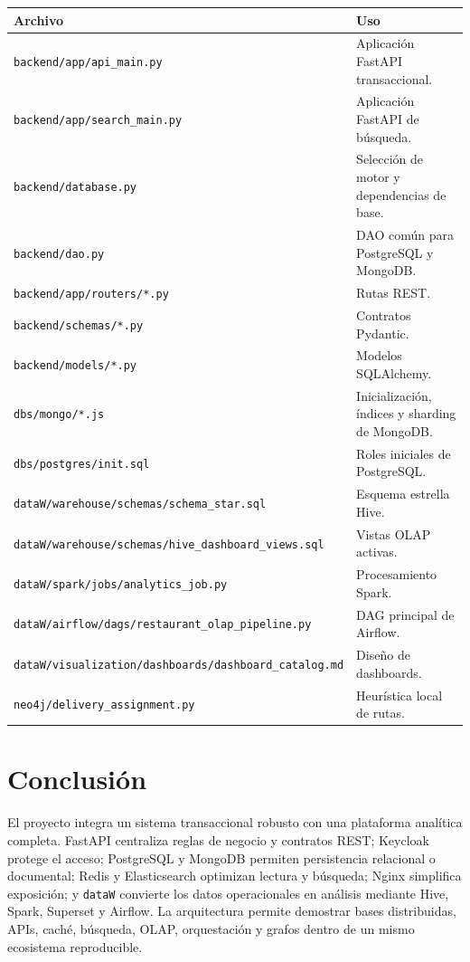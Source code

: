 \documentclass[12pt,letterpaper]{article}
\def\codefile#1{\nolinkurl{#1}}
\begin{document}
\small
\begin{tabularx}{\textwidth}{>{\raggedright\arraybackslash}X >{\raggedright\arraybackslash}X}
\toprule
\textbf{Archivo} & \textbf{Uso}\\
\midrule
\codefile{backend/app/api_main.py} & Aplicación FastAPI transaccional.\\
\codefile{backend/app/search_main.py} & Aplicación FastAPI de búsqueda.\\
\codefile{backend/database.py} & Selección de motor y dependencias de base.\\
\codefile{backend/dao.py} & DAO común para PostgreSQL y MongoDB.\\
\codefile{backend/app/routers/*.py} & Rutas REST.\\
\codefile{backend/schemas/*.py} & Contratos Pydantic.\\
\codefile{backend/models/*.py} & Modelos SQLAlchemy.\\
\codefile{dbs/mongo/*.js} & Inicialización, índices y sharding de MongoDB.\\
\codefile{dbs/postgres/init.sql} & Roles iniciales de PostgreSQL.\\
\codefile{dataW/warehouse/schemas/schema_star.sql} & Esquema estrella Hive.\\
\codefile{dataW/warehouse/schemas/hive_dashboard_views.sql} & Vistas OLAP activas.\\
\codefile{dataW/spark/jobs/analytics_job.py} & Procesamiento Spark.\\
\codefile{dataW/airflow/dags/restaurant_olap_pipeline.py} & DAG principal de Airflow.\\
\codefile{dataW/visualization/dashboards/dashboard_catalog.md} & Diseño de dashboards.\\
\codefile{neo4j/delivery_assignment.py} & Heurística local de rutas.\\
\bottomrule
\end{tabularx}

\section{Conclusión}

El proyecto integra un sistema transaccional robusto con una plataforma analítica completa. FastAPI centraliza reglas de negocio y contratos REST; Keycloak protege el acceso; PostgreSQL y MongoDB permiten persistencia relacional o documental; Redis y Elasticsearch optimizan lectura y búsqueda; Nginx simplifica exposición; y \codefile{dataW} convierte los datos operacionales en análisis mediante Hive, Spark, Superset y Airflow. La arquitectura permite demostrar bases distribuidas, APIs, caché, búsqueda, OLAP, orquestación y grafos dentro de un mismo ecosistema reproducible.
\end{document}
